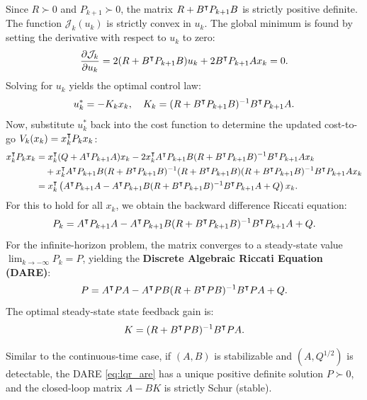 Since $R \succ 0$ and $P_{k+1} \succ 0$, the matrix $R + B^\intercal P_{k+1} B$ is strictly positive definite. The function $\mathcal{J}_k(u_k)$ is strictly convex in $u_k$. The global minimum is found by setting the derivative with respect to $u_k$ to zero:
\begin{equation}
\frac{\partial \mathcal{J}_k}{\partial u_k} = 2 (R + B^\intercal P_{k+1} B) u_k + 2 B^\intercal P_{k+1} A x_k = 0 .
\end{equation}
Solving for $u_k$ yields the optimal control law:
\begin{equation}
    u_k^* = -K_k x_k, \quad K_k = (R + B^\intercal P_{k+1} B)^{-1} B^\intercal P_{k+1} A . \label{eq:lqr_dt_gain}
\end{equation}
Now, substitute $u_k^*$ back into the cost function to determine the updated cost-to-go $V_k(x_k) = x_k^\intercal P_k x_k$:
\begin{align}
    x_k^\intercal P_k x_k &= x_k^\intercal (Q + A^\intercal P_{k+1} A) x_k - 2 x_k^\intercal A^\intercal P_{k+1} B (R + B^\intercal P_{k+1} B)^{-1} B^\intercal P_{k+1} A x_k \nonumber \\
    &\quad + x_k^\intercal A^\intercal P_{k+1} B (R + B^\intercal P_{k+1} B)^{-1} (R + B^\intercal P_{k+1} B) (R + B^\intercal P_{k+1} B)^{-1} B^\intercal P_{k+1} A x_k \nonumber \\
&= x_k^\intercal \left( A^\intercal P_{k+1} A - A^\intercal P_{k+1} B (R + B^\intercal P_{k+1} B)^{-1} B^\intercal P_{k+1} A + Q \right) x_k .
\end{align}
For this to hold for all $x_k$, we obtain the backward difference Riccati equation:
\begin{equation}
P_k = A^\intercal P_{k+1} A - A^\intercal P_{k+1} B (R + B^\intercal P_{k+1} B)^{-1} B^\intercal P_{k+1} A + Q .
\end{equation}
For the infinite-horizon problem, the matrix converges to a steady-state value $\lim_{k\to-\infty} P_k = P$, yielding the \textbf{Discrete Algebraic Riccati Equation (DARE)}:
\begin{equation}
    P = A^\intercal P A - A^\intercal P B (R + B^\intercal P B)^{-1} B^\intercal P A + Q . \label{eq:lqr_dare}
\end{equation}
The optimal steady-state state feedback gain is:
\begin{equation}
    K = (R + B^\intercal P B)^{-1} B^\intercal P A . \label{eq:lqr_dt_optimal_gain}
\end{equation}

Similar to the continuous-time case, if $(A, B)$ is stabilizable and $(A, Q^{1/2})$ is detectable, the DARE \eqref{eq:lqr_are} has a unique positive definite solution $P \succ 0$, and the closed-loop matrix $A - B K$ is strictly Schur (stable).

